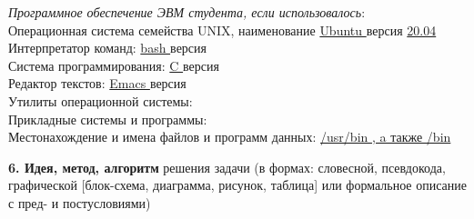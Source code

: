 \documentclass[10pt]{report}
\begin{document}
\begin{spacing}{1}
        \indent \textit{Программное обеспечение ЭВМ студента, если использовалось}:  \\ 
        \indent Операционная система семейства UNIX, наименование \underline{ Ubuntu } версия \underline{ 20.04 }\\
        \indent Интерпретатор  команд: \underline{ bash } версия \tlinee{0.5in}\\
        \indent Система программирования: \underline{ C } версия \tlinee{0.5in}\\
        \indent Редактор текстов: \underline{ Emacs } версия \tlinee{0.5in}\\
        \indent Утилиты операционной системы: \tlinee{4in}\\
        \indent Прикладные системы и программы: \tlinee{3.7in}\\
        \indent Местонахождение и имена файлов и программ данных: \underline{ /usr/bin , a также /bin }\\

    \end{spacing}
    \newpage
    \indent \textbf{6. Идея, метод, алгоритм} решения задачи (в формах: словесной, псевдокода, графической [блок-схема, диаграмма, рисунок, таблица] или формальное описание с пред- и постусловиями)\\
    
   
    
    
\end{document}
